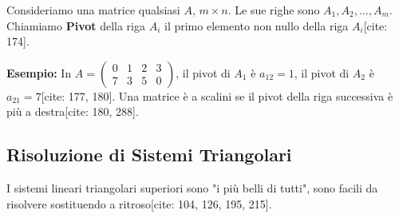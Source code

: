\documentclass[11pt,a4paper]{article}
\begin{document}
\begin{concept}
Consideriamo una matrice qualsiasi $A$, $m \times n$. Le sue righe sono $A_1, A_2, \dots, A_m$.
Chiamiamo \textbf{Pivot} della riga $A_i$ il primo elemento non nullo della riga $A_i$[cite: 174].

\textbf{Esempio:} In $A = \begin{pmatrix} 0 & 1 & 2 & 3 \\ 7 & 3 & 5 & 0 \end{pmatrix}$, il pivot di $A_1$ è $a_{12} = 1$, il pivot di $A_2$ è $a_{21} = 7$[cite: 177, 180]. 
Una matrice è a scalini se il pivot della riga successiva è più a destra[cite: 180, 288].
\end{concept}


\subsection{Risoluzione di Sistemi Triangolari}
I sistemi lineari triangolari superiori sono "i più belli di tutti", sono facili da risolvere sostituendo a ritroso[cite: 104, 126, 195, 215].
\end{document}
